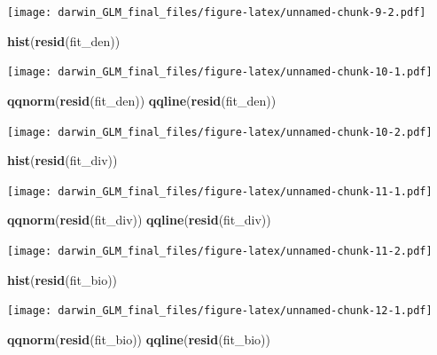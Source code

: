 \documentclass[]{article}
\newenvironment{Shaded}{\begin{snugshade}}{\end{snugshade}}
\newcommand{\KeywordTok}[1]{\textcolor[rgb]{0.13,0.29,0.53}{\textbf{#1}}}
\newcommand{\NormalTok}[1]{#1}
\begin{document}
\texttt{[image: darwin\_GLM\_final\_files/figure-latex/unnamed-chunk-9-2.pdf]}

\begin{Shaded}
\begin{Highlighting}[]
\KeywordTok{hist}\NormalTok{(}\KeywordTok{resid}\NormalTok{(fit_den))}
\end{Highlighting}
\end{Shaded}

\texttt{[image: darwin\_GLM\_final\_files/figure-latex/unnamed-chunk-10-1.pdf]}

\begin{Shaded}
\begin{Highlighting}[]
\KeywordTok{qqnorm}\NormalTok{(}\KeywordTok{resid}\NormalTok{(fit_den))}
\KeywordTok{qqline}\NormalTok{(}\KeywordTok{resid}\NormalTok{(fit_den))}
\end{Highlighting}
\end{Shaded}

\texttt{[image: darwin\_GLM\_final\_files/figure-latex/unnamed-chunk-10-2.pdf]}

\begin{Shaded}
\begin{Highlighting}[]
\KeywordTok{hist}\NormalTok{(}\KeywordTok{resid}\NormalTok{(fit_div))}
\end{Highlighting}
\end{Shaded}

\texttt{[image: darwin\_GLM\_final\_files/figure-latex/unnamed-chunk-11-1.pdf]}

\begin{Shaded}
\begin{Highlighting}[]
\KeywordTok{qqnorm}\NormalTok{(}\KeywordTok{resid}\NormalTok{(fit_div))}
\KeywordTok{qqline}\NormalTok{(}\KeywordTok{resid}\NormalTok{(fit_div))}
\end{Highlighting}
\end{Shaded}

\texttt{[image: darwin\_GLM\_final\_files/figure-latex/unnamed-chunk-11-2.pdf]}

\begin{Shaded}
\begin{Highlighting}[]
\KeywordTok{hist}\NormalTok{(}\KeywordTok{resid}\NormalTok{(fit_bio))}
\end{Highlighting}
\end{Shaded}

\texttt{[image: darwin\_GLM\_final\_files/figure-latex/unnamed-chunk-12-1.pdf]}

\begin{Shaded}
\begin{Highlighting}[]
\KeywordTok{qqnorm}\NormalTok{(}\KeywordTok{resid}\NormalTok{(fit_bio))}
\KeywordTok{qqline}\NormalTok{(}\KeywordTok{resid}\NormalTok{(fit_bio))}
\end{Highlighting}
\end{Shaded}
\end{document}
